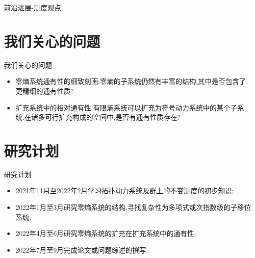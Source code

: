 \documentclass[11pt]{beamer}                                                                                                                 \usetheme{Madrid}
\begin{document}
\begin{CJK}{UTF8}{gbsn}
\begin{frame}{前沿进展-测度观点}
	\end{frame}
	
	
	
	\section{我们关心的问题}
	
	\begin{frame}{我们关心的问题}
		\begin{itemize}
			\item 零熵系统通有性的细致刻画:零熵的子系统仍然有丰富的结构,其中是否包含了更精细的通有性质?
			\item 扩充系统中的相对通有性:有限熵系统可以扩充为符号动力系统中的某个子系统.在诸多可行扩充构成的空间中,是否有通有性质存在?
		\end{itemize}
	\end{frame}
	
	
	
	
	\section{研究计划}
	\begin{frame}{研究计划}
	\begin{itemize}
		\item 2021年11月至2022年2月学习拓扑动力系统及群上的不变测度的初步知识;
		\item 2022年1月至3月研究零熵系统的结构,寻找复杂性为多项式或次指数级的子移位系统;
		\item 2022年4月至6月研究零熵系统的扩充在扩充系统中的通有性;
		\item 2022年7月至9月完成论文或问题综述的撰写.
	\end{itemize}
	

	\end{frame}

\end{CJK}
\end{document}
